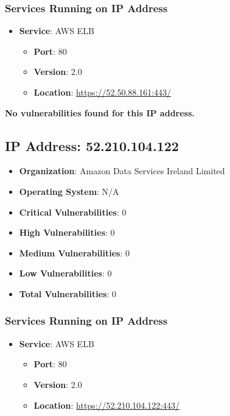 \documentclass{article}
\begin{document}
\subsubsection*{Services Running on IP Address}

\begin{itemize}
    
        \item \textbf{Service}: AWS ELB
        \begin{itemize}
            \item \textbf{Port}: 80
            \item \textbf{Version}:  2.0 
            \item \textbf{Location}: \href{ https://52.50.88.161:443/ }{ https://52.50.88.161:443/ }
        \end{itemize}
    
\end{itemize}


\textbf{No vulnerabilities found for this IP address.}




\clearpage



\subsection{IP Address: 52.210.104.122}

\begin{itemize}
    \item \textbf{Organization}: Amazon Data Services Ireland Limited
    \item \textbf{Operating System}:  N/A 
    \item \textbf{Critical Vulnerabilities}: 0
    \item \textbf{High Vulnerabilities}: 0
    \item \textbf{Medium Vulnerabilities}: 0
    \item \textbf{Low Vulnerabilities}: 0
    \item \textbf{Total Vulnerabilities}: 0
\end{itemize}

\subsubsection*{Services Running on IP Address}

\begin{itemize}
    
        \item \textbf{Service}: AWS ELB
        \begin{itemize}
            \item \textbf{Port}: 80
            \item \textbf{Version}:  2.0 
            \item \textbf{Location}: \href{ https://52.210.104.122:443/ }{ https://52.210.104.122:443/ }
        \end{itemize}
    
\end{itemize}
\end{document}
